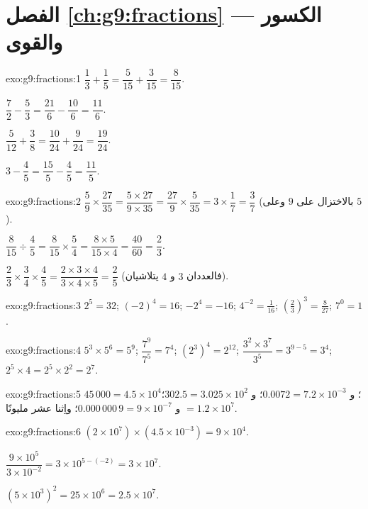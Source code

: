 \section*{الفصل \ref{ch:g9:fractions} --- الكسور والقوى}

\begin{solution}{exo:g9:fractions:1}
$\dfrac13 + \dfrac15 = \dfrac{5}{15} + \dfrac{3}{15} = \dfrac{8}{15}$.

$\dfrac72 - \dfrac53 = \dfrac{21}{6} - \dfrac{10}{6} = \dfrac{11}{6}$.

$\dfrac{5}{12} + \dfrac38 = \dfrac{10}{24} + \dfrac{9}{24} =
\dfrac{19}{24}$.

$3 - \dfrac45 = \dfrac{15}{5} - \dfrac45 = \dfrac{11}{5}$.
\end{solution}

\begin{solution}{exo:g9:fractions:2}
$\dfrac59 \times \dfrac{27}{35} = \dfrac{5 \times 27}{9 \times 35}
= \dfrac{27}{9} \times \dfrac{5}{35} = 3 \times \dfrac17 = \dfrac37$
(بالاختزال على $9$ وعلى $5$).

$\dfrac{8}{15} \div \dfrac45 = \dfrac{8}{15} \times \dfrac54
= \dfrac{8 \times 5}{15 \times 4} = \dfrac{40}{60} = \dfrac23$.

$\dfrac23 \times \dfrac34 \times \dfrac45 = \dfrac{2 \times 3 \times 4}
{3 \times 4 \times 5} = \dfrac25$ (فالعددان $3$ و $4$ يتلاشيان).
\end{solution}

\begin{solution}{exo:g9:fractions:3}
$2^5 = 32$; \quad $(-2)^4 = 16$; \quad $-2^4 = -16$; \quad
$4^{-2} = \frac{1}{16}$; \quad
$\left(\frac23\right)^3 = \frac{8}{27}$; \quad $7^0 = 1$.
\end{solution}

\begin{solution}{exo:g9:fractions:4}
$5^3 \times 5^6 = 5^9$; \quad $\dfrac{7^9}{7^5} = 7^4$; \quad
$\left(2^3\right)^4 = 2^{12}$; \quad
$\dfrac{3^2 \times 3^7}{3^5} = 3^{9-5} = 3^4$; \quad
$2^5 \times 4 = 2^5 \times 2^2 = 2^7$.
\end{solution}

\begin{solution}{exo:g9:fractions:5}
$45\,000 = 4.5 \times 10^4$؛ \quad
و $0.0072 = 7.2 \times 10^{-3}$؛ \quad
و $302.5 = 3.025 \times 10^2$؛ \quad
و $0.000\,000\,9 = 9 \times 10^{-7}$؛ \quad
واِثنا عشر مليونًا $= 1.2 \times 10^7$.
\end{solution}

\begin{solution}{exo:g9:fractions:6}
$(2 \times 10^7) \times (4.5 \times 10^{-3}) = 9 \times 10^{4}$.

$\dfrac{9 \times 10^5}{3 \times 10^{-2}} = 3 \times 10^{5 - (-2)}
= 3 \times 10^7$.

$(5 \times 10^3)^2 = 25 \times 10^6 = 2.5 \times 10^7$.
\end{solution}

